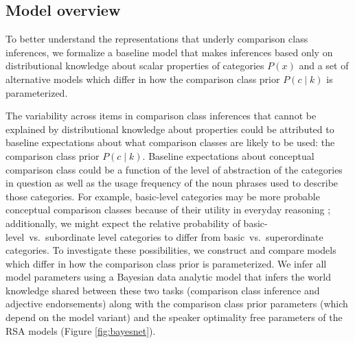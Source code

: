 \documentclass[doc]{apa6}
\begin{document}
\subsection{Model overview}

To better understand the representations that underly comparison class inferences, we formalize a baseline model that makes inferences based only on distributional knowledge about scalar properties of categories $P(x)$ and a set of alternative models which differ in how the comparison class prior $P(c \mid k)$ is parameterized. 

The variability across items in comparison class inferences that cannot be explained by distributional knowledge about properties could be attributed to baseline expectations about what comparison classes are likely to be used: the comparison class prior $P(c \mid k)$. 
Baseline expectations about conceptual comparison class could be a function of the level of abstraction of the categories in question as well as the usage frequency of the noun phrases used to describe those categories. 
For example, basic-level categories may be more probable conceptual comparison classes because of their utility in everyday reasoning \cite{rosch1975family}; additionally, we might expect the relative probability of basic-level~vs.~subordinate level categories to differ from basic~vs.~superordinate categories.
To investigate these possibilities, we construct and compare models which differ in how the comparison class prior is parameterized.
We infer all model parameters using a Bayesian data analytic model that infers the world knowledge shared between these two tasks (comparison class inference and adjective endorsements) along with the comparison class prior parameters (which depend on the model variant) and the speaker optimality free parameters of the RSA models (Figure \ref{fig:bayesnet}). 

\end{document}
